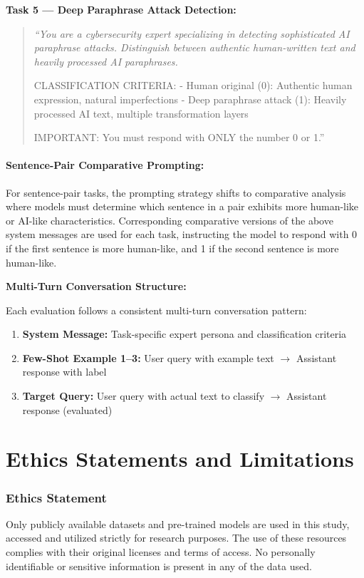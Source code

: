 \noindent \textbf{Task 5 --- Deep Paraphrase Attack Detection:}
\begin{quote}
\itshape
``You are a cybersecurity expert specializing in detecting sophisticated AI paraphrase attacks. Distinguish between authentic human-written text and heavily processed AI paraphrases.

CLASSIFICATION CRITERIA:
- Human original (0): Authentic human expression, natural imperfections
- Deep paraphrase attack (1): Heavily processed AI text, multiple transformation layers

IMPORTANT: You must respond with ONLY the number 0 or 1.''
\end{quote}

\paragraph{Sentence-Pair Comparative Prompting:}
For sentence-pair tasks, the prompting strategy shifts to comparative analysis where models must determine which sentence in a pair exhibits more human-like or AI-like characteristics. Corresponding comparative versions of the above system messages are used for each task, instructing the model to respond with 0 if the first sentence is more human-like, and 1 if the second sentence is more human-like.

\noindent \textbf{Multi-Turn Conversation Structure:}

Each evaluation follows a consistent multi-turn conversation pattern:
\begin{enumerate}
    \item \textbf{System Message:} Task-specific expert persona and classification criteria
    \item \textbf{Few-Shot Example 1--3:} User query with example text $\to$ Assistant response with label
    \item \textbf{Target Query:} User query with actual text to classify $\to$ Assistant response (evaluated)
\end{enumerate}

\section{Ethics Statements and Limitations}

\subsubsection{Ethics Statement}
Only publicly available datasets and pre-trained models are used in this study, accessed and utilized strictly for research purposes. The use of these resources complies with their original licenses and terms of access. No personally identifiable or sensitive information is present in any of the data used.


